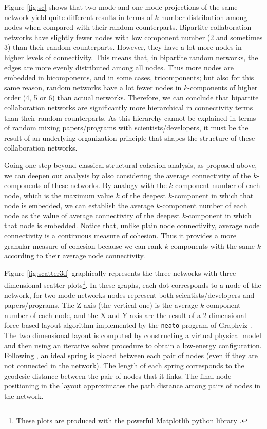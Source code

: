 Figure \ref{fig:sc} shows that two-mode and one-mode projections of the same network yield quite different results in terms of $k$-number distribution among nodes when compared with their random counterparts. Bipartite collaboration networks have slightly fewer nodes with low component number (2 and sometimes 3) than their random counterparts. However, they have a lot more nodes in higher levels of connectivity. This means that, in bipartite random networks, the edges are more evenly distributed among all nodes. Thus more nodes are embedded in bicomponents, and in some cases, tricomponents; but also for this same reason, random networks have a lot fewer nodes in $k$-components of higher order (4, 5 or 6) than actual networks. Therefore, we can conclude that bipartite collaboration networks are significantly more hierarchical in connectivity terms than their random counterparts. As this hierarchy cannot be explained in terms of random mixing papers/programs with scientists/developers, it must be the result of an underlying organization principle that shapes the structure of these collaboration networks.

Going one step beyond classical structural cohesion analysis, as proposed above, we can deepen our analysis by also considering the average connectivity of the $k$-components of these networks. By analogy with the $k$-component number of each node, which is the maximum value $k$ of the deepest $k$-component in which that node is embedded, we can establish the average $k$-component number of each node as the value of average connectivity of the deepest $k$-component in which that node is embedded. Notice that, unlike plain node connectivity, average node connectivity is a continuous measure of cohesion. Thus it provides a more granular measure of cohesion because we can rank $k$-components with the same $k$ according to their average node connectivity.

Figure \ref{fig:scatter3d} graphically represents the three networks with three-dimensional scatter plots\footnote{These plots are produced with the powerful Matplotlib python library \citep{hunter:2007}.}.  In these graphs, each dot corresponds to a node of the network, for two-mode networks nodes represent both scientists/developers and papers/programs. The Z axis (the vertical one) is the average $k$-component number of each node, and the X and Y axis are the result of a 2 dimensional force-based layout algorithm implemented by the \texttt{neato} program of Graphviz \citep{graphviz}. The two dimensional layout is computed by constructing a virtual physical model and then using an iterative solver procedure to obtain a low-energy configuration. Following \citet{kamada:1989}, an ideal spring is placed between each pair of nodes (even if they are not connected in the network). The length of each spring corresponds to the geodesic distance between the pair of nodes that it links. The final node positioning in the layout approximates the path distance among pairs of nodes in the network.

